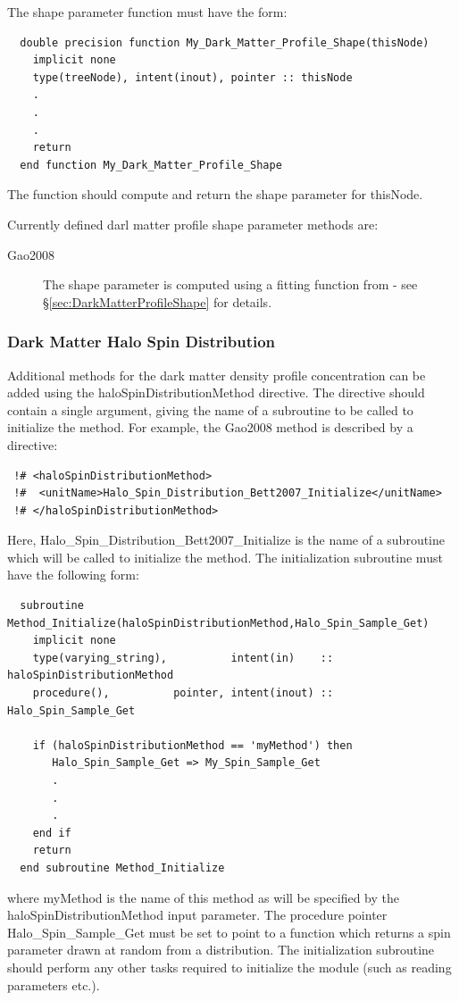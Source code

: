 The shape parameter function must have the form:
\begin{verbatim}
  double precision function My_Dark_Matter_Profile_Shape(thisNode)
    implicit none
    type(treeNode), intent(inout), pointer :: thisNode
    .
    .
    .
    return
  end function My_Dark_Matter_Profile_Shape
\end{verbatim}
The function should compute and return the shape parameter for {\normalfont \ttfamily thisNode}.

Currently defined darl matter profile shape parameter methods are:
\begin{description}
 \item [{\normalfont \ttfamily Gao2008}] The shape parameter is computed using a fitting function from \cite{gao_redshift_2008} - see \S\ref{sec:DarkMatterProfileShape} for details.
\end{description}

\subsubsection{Dark Matter Halo Spin Distribution}\label{sec:HaloSpinDistribution}

Additional methods for the dark matter density profile concentration can be added using the {\normalfont \ttfamily haloSpinDistributionMethod} directive. The directive should contain a single argument, giving the name of a subroutine to be called to initialize the method. For example, the {\normalfont \ttfamily Gao2008} method is described by a directive:
\begin{verbatim}
 !# <haloSpinDistributionMethod>
 !#  <unitName>Halo_Spin_Distribution_Bett2007_Initialize</unitName>
 !# </haloSpinDistributionMethod>
\end{verbatim}
Here, {\normalfont \ttfamily Halo\_Spin\_Distribution\_Bett2007\_Initialize} is the name of a subroutine which will be called to initialize the method. The initialization subroutine must have the following form:
\begin{verbatim}
  subroutine Method_Initialize(haloSpinDistributionMethod,Halo_Spin_Sample_Get)
    implicit none
    type(varying_string),          intent(in)    :: haloSpinDistributionMethod
    procedure(),          pointer, intent(inout) :: Halo_Spin_Sample_Get
    
    if (haloSpinDistributionMethod == 'myMethod') then
       Halo_Spin_Sample_Get => My_Spin_Sample_Get
       .
       .
       .
    end if
    return
  end subroutine Method_Initialize
\end{verbatim}
where {\normalfont \ttfamily myMethod} is the name of this method as will be specified by the {\normalfont \ttfamily haloSpinDistributionMethod} input parameter. The procedure pointer {\normalfont \ttfamily Halo\_Spin\_Sample\_Get} must be set to point to a function which returns a spin parameter drawn at random from a distribution. The initialization subroutine should perform any other tasks required to initialize the module (such as reading parameters etc.).

